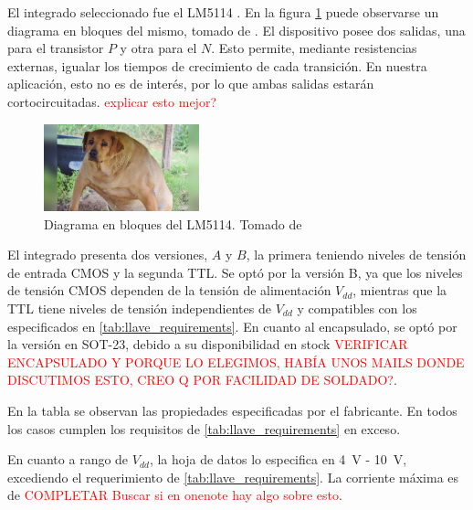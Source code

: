 El integrado seleccionado fue el LM5114 \cite{LM5114_datasheet}. En la figura
\ref{fig:lm5114_block_diagram} puede observarse un diagrama en bloques del
mismo, tomado de \cite{LM5114_datasheet}. El dispositivo posee dos salidas, una
para el transistor $P$ y otra para el $N$. Esto permite, mediante resistencias
externas, igualar los tiempos de crecimiento de cada transición. En nuestra
aplicación, esto no es de interés, por  lo que ambas salidas estarán
cortocircuitadas. \textcolor{red}{explicar esto mejor?}

\begin{figure}[tbp]
    \centering
    \includegraphics[width=0.4\textwidth]{images/placeholder.jpg}
    \caption{Diagrama en bloques del LM5114. Tomado de \cite{LM5114_datasheet}}
    \label{fig:lm5114_block_diagram}
\end{figure}

El integrado presenta dos versiones, $A$ y $B$, la primera teniendo niveles de
tensión de entrada CMOS y la segunda TTL.  Se optó por la versión B, ya que los
niveles de tensión CMOS dependen de la tensión de alimentación $V_{dd}$,
mientras que la TTL tiene niveles de tensión independientes de $V_{dd}$ y
compatibles con los especificados en \ref{tab:llave_requirements}. En cuanto al
encapsulado, se optó por la versión en SOT-23, debido a su disponibilidad en
stock \textcolor{red}{VERIFICAR ENCAPSULADO Y PORQUE LO ELEGIMOS, HABÍA UNOS
MAILS DONDE DISCUTIMOS ESTO, CREO Q POR FACILIDAD DE SOLDADO?}.

En la tabla se observan las propiedades especificadas por el fabricante. En
todos los casos cumplen los requisitos de \ref{tab:llave_requirements} en exceso.

En cuanto a rango de $V_{dd}$, la hoja de datos lo especifica en \qty{4}{\volt}
- \qty{10}{\volt}, excediendo el requerimiento de \ref{tab:llave_requirements}.
La corriente máxima es de \textcolor{red}{COMPLETAR} \textcolor{red}{Buscar si
en onenote hay algo sobre esto}.

